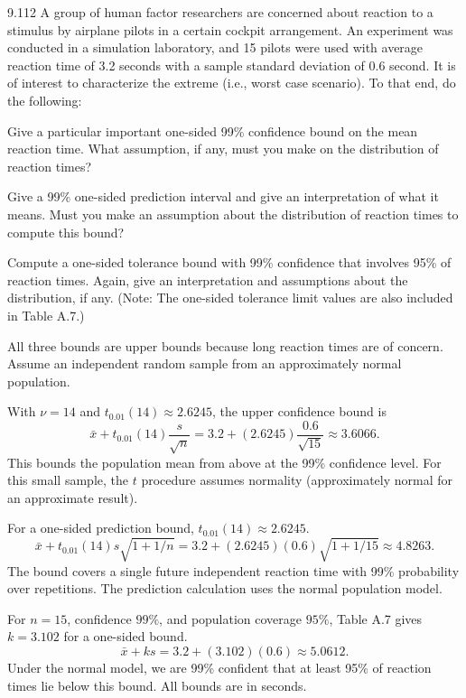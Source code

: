 \documentclass[11pt,oneside]{article}
\begin{document}
\begin{exercise}{9.112}
A group of human factor researchers are concerned about reaction to a stimulus by airplane pilots in a certain cockpit arrangement. An experiment was conducted in a simulation laboratory, and 15 pilots were used with average reaction time of 3.2 seconds with a sample standard deviation of 0.6 second. It is of interest to characterize the extreme (i.e., worst case scenario). To that end, do the following:
\begin{exercisesubparts}
\item Give a particular important one-sided 99\% confidence bound on the mean reaction time. What assumption, if any, must you make on the distribution of reaction times?
\item Give a 99\% one-sided prediction interval and give an interpretation of what it means. Must you make an assumption about the distribution of reaction times to compute this bound?
\item Compute a one-sided tolerance bound with 99\% confidence that involves 95\% of reaction times. Again, give an interpretation and assumptions about the distribution, if any. (Note: The one-sided tolerance limit values are also included in Table A.7.)
\end{exercisesubparts}
\end{exercise}
\begin{solution}
All three bounds are upper bounds because long reaction times are of concern. Assume an independent random sample from an approximately normal population.
\begin{exercisesubparts}
\item With $\nu=14$ and $t_{0.01}(14)\approx2.6245$, the upper confidence bound is
\[
\bar x+t_{0.01}(14)\frac{s}{\sqrt n}=3.2+(2.6245)\frac{0.6}{\sqrt{15}}\approx\boxed{3.6066}.
\]
This bounds the population mean from above at the 99\% confidence level. For this small sample, the $t$ procedure assumes normality (approximately normal for an approximate result).
\item For a one-sided prediction bound, $t_{0.01}(14)\approx2.6245$. 
\[
\bar x+t_{0.01}(14)s\sqrt{1+1/n}=3.2+(2.6245)(0.6)\sqrt{1+1/15}\approx\boxed{4.8263}.
\]
The bound covers a single future independent reaction time with 99\% probability over repetitions. The prediction calculation uses the normal population model.
\item For $n=15$, confidence $99\%$, and population coverage $95\%$, Table A.7 gives $k=3.102$ for a one-sided bound.
\[
\bar x+ks=3.2+(3.102)(0.6)\approx\boxed{5.0612}.
\]
Under the normal model, we are 99\% confident that at least 95\% of reaction times lie below this bound. All bounds are in seconds.
\end{exercisesubparts}
\end{solution}
\end{document}
